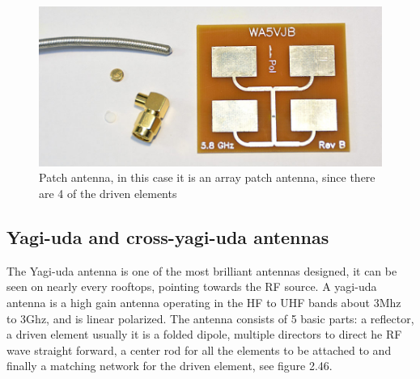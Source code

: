 \begin{figure}[h]
\centering
\includegraphics[scale=0.5]{figures/PatchAntenna.jpg}
\caption{Patch antenna, in this case it is an array patch antenna, since there are 4 of the driven elements\cite{PatchAntenna}}
\end{figure}

\subsection{Yagi-uda and cross-yagi-uda antennas}
The Yagi-uda antenna is one of the most brilliant antennas designed, it can be seen on nearly every rooftops, pointing towards the RF source. A yagi-uda antenna is a high gain antenna operating in the HF to UHF bands about 3Mhz to 3Ghz, and is linear polarized. The antenna consists of 5 basic parts: a reflector, a driven element usually it is a folded dipole, multiple directors to direct he RF wave straight forward, a center rod for all the elements to be attached to and finally a matching network for the driven element, see figure 2.46.

